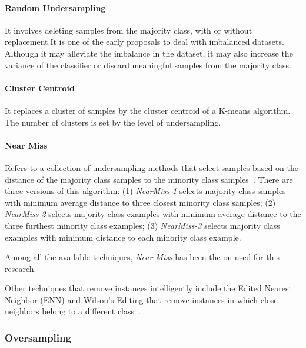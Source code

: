 \paragraph{Random Undersampling}

It involves deleting samples from the majority class, with or without 
replacement.It is one of the early proposals to deal with imbalanced datasets.
Although it may alleviate the imbalance in the dataset, it may also increase the
variance of the classifier or discard meaningful samples from the majority 
class.

\paragraph{Cluster Centroid}

It replaces a cluster of samples by the cluster centroid of a K-means 
algorithm. The number of clusters is set by the level of undersampling.

\paragraph{Near Miss}\label{nearmiss}

Refers to a collection of undersampling methods that select samples based on 
the distance of the majority class samples to the minority class 
samples~\cite{Zhang03}. There are three versions of this algorithm: 
(1) \textit{NearMiss-1} selects majority class samples with minimum average
distance to three closest minority class samples; 
(2) \textit{NearMiss-2} selects majority class examples with minimum average 
distance to the three furthest minority class examples;
(3) \textit{NearMiss-3} selects majority class examples with minimum distance 
to each minority class example.

Among all the available techniques, \textit{Near Miss} has been the on used
for this research.

Other techniques that remove instances intelligently include the Edited Nearest
Neighbor (ENN) and Wilson's Editing that remove instances in which close 
neighbors belong to a  different class~\cite{wilson1972asymptotic}.

\subsubsection{Oversampling}

